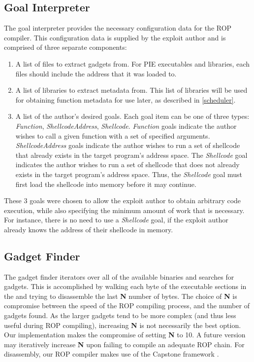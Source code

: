 \documentclass[journal]{IEEEtran}
\begin{document}
\subsection{Goal Interpreter}
The goal interpreter provides the necessary configuration data for the ROP compiler.
This configuration data is supplied by the exploit author and is comprised of three separate components:
\begin{enumerate}
  \item A list of files to extract gadgets from.  For PIE executables and libraries, each files should include the address that it was loaded to.
  \item A list of libraries to extract metadata from.  This list of libraries will be used for obtaining function metadata for use later, as described in \ref{scheduler}.
  \item A list of the author's desired goals.  Each goal item can be one of three types: \emph{Function}, \emph{ShellcodeAddress}, \emph{Shellcode}.
  \emph{Function} goals indicate the author wishes to call a given function with a set of specified arguments.  
  \emph{ShellcodeAddress} goals indicate the author wishes to run a set of shellcode that already exists in the target program's address space.
  The \emph{Shellcode} goal indicates the author wishes to run a set of shellcode that does not already exists in the target program's address space.
  Thus, the \emph{Shellcode} goal must first load the shellcode into memory before it may continue.
\end{enumerate}
These 3 goals were chosen to allow the exploit author to obtain arbitrary code execution, while also specifying the minimum amount of work that is necessary.
For instance, there is no need to use a \emph{Shellcode} goal, if the exploit author already knows the address of their shellcode in memory.

\subsection{Gadget Finder}
The gadget finder iterators over all of the available binaries and searches for gadgets.
This is accomplished by walking each byte of the executable sections in the and trying to disassemble the last \textbf{N} number of bytes.
The choice of \textbf{N} is compromise between the speed of the ROP compiling process, and the number of gadgets found.
As the larger gadgets tend to be more complex (and thus less useful during ROP compiling), increasing \textbf{N} is not necessarily the best option.
Our implementation makes the compromise of setting \textbf{N} to 10.
A future version may iteratively increase \textbf{N} upon failing to compile an adequate ROP chain.
For disassembly, our ROP compiler makes use of the Capstone framework \cite{capstone}.
\end{document}
